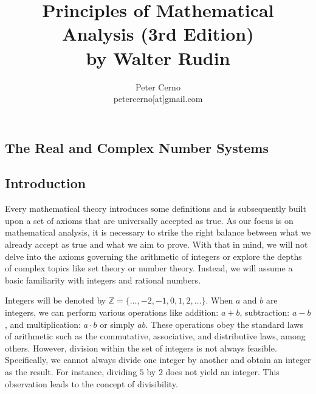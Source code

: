 \documentclass[10pt,varwidth=6in,margin=0.2in,preview]{standalone}
\title{
    Principles of Mathematical Analysis (3rd Edition)\\
    by Walter Rudin
}
\author{
    Peter Cerno\\
    \small petercerno[at]gmail.com
}
\begin{document}
\begin{flushleft}

\pagecolor{pagecolor}


\setcounter{section}{0}
\section{The Real and Complex Number Systems}

\setcounter{subsection}{0}
\subsection*{Introduction}

Every mathematical theory introduces some definitions and is subsequently built upon a set of axioms that are universally accepted as true. As our focus is on mathematical analysis, it is necessary to strike the right balance between what we already accept as true and what we aim to prove. With that in mind, we will not delve into the axioms governing the arithmetic of integers or explore the depths of complex topics like set theory or number theory. Instead, we will assume a basic familiarity with integers and rational numbers.

Integers will be denoted by $\mathbb{Z} = \{ \ldots, -2, -1, 0, 1, 2, \ldots \}$. When $a$ and $b$ are integers, we can perform various operations like addition: $a + b$, subtraction: $a - b$, and multiplication: $a \cdot b$ or simply $ab$. These operations obey the standard laws of arithmetic such as the commutative, associative, and distributive laws, among others. However, division within the set of integers is not always feasible. Specifically, we cannot always divide one integer by another and obtain an integer as the result. For instance, dividing $5$ by $2$ does not yield an integer. This observation leads to the concept of divisibility.


\end{flushleft}
\end{document}
